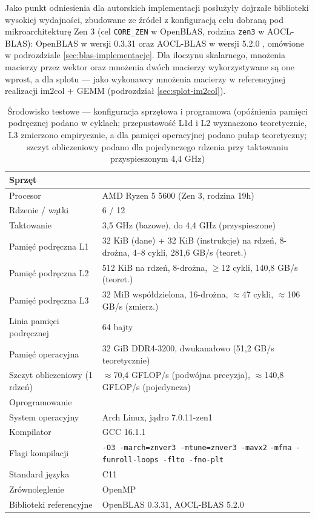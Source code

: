 \documentclass[a4paper,12pt]{book} %
\begin{document}
Jako punkt odniesienia dla autorskich implementacji posłużyły dojrzałe biblioteki wysokiej wydajności, zbudowane ze źródeł z konfiguracją celu dobraną pod mikroarchitekturę Zen 3 (cel \texttt{CORE\_ZEN} w OpenBLAS, rodzina \texttt{zen3} w AOCL-BLAS): OpenBLAS w wersji 0.3.31 \cite{zhang2012openblas} oraz AOCL-BLAS w wersji 5.2.0 \cite{amd_aocl_blas}, omówione w podrozdziale \ref{sec:blas-implementacje}. Dla iloczynu skalarnego, mnożenia macierzy przez wektor oraz mnożenia dwóch macierzy wykorzystywane są one wprost, a dla splotu --- jako wykonawcy mnożenia macierzy w referencyjnej realizacji im2col $+$ GEMM (podrozdział \ref{sec:splot-im2col}).

\begin{table}[t!]
\centering
\caption{Środowisko testowe --- konfiguracja sprzętowa i programowa (opóźnienia pamięci podręcznej podano w cyklach; przepustowość L1d i L2 wyznaczono teoretycznie, L3 zmierzono empirycznie, a dla pamięci operacyjnej podano pułap teoretyczny; szczyt obliczeniowy podano dla pojedynczego rdzenia przy taktowaniu przyspieszonym 4,4 GHz)}
\label{tab:srodowisko}
\begin{tabular}{l p{}}
\hline
\multicolumn{2}{l}{Sprzęt} \\
\hline
Procesor & AMD Ryzen 5 5600 (Zen 3, rodzina 19h) \\
Rdzenie / wątki & 6 / 12 \\
Taktowanie & 3,5 GHz (bazowe), do 4,4 GHz (przyspieszone) \\
Pamięć podręczna L1 & 32 KiB (dane) + 32 KiB (instrukcje) na rdzeń, 8-drożna, 4--8 cykli, 281,6 GB/s (teoret.) \\
Pamięć podręczna L2 & 512 KiB na rdzeń, 8-drożna, $\ge$12 cykli, 140,8 GB/s (teoret.) \\
Pamięć podręczna L3 & 32 MiB współdzielona, 16-drożna, $\approx$47 cykli, $\approx$106 GB/s (zmierz.) \\
Linia pamięci podręcznej & 64 bajty \\
Pamięć operacyjna & 32 GiB DDR4-3200, dwukanałowo (51,2 GB/s teoretycznie) \\
Szczyt obliczeniowy (1 rdzeń) & $\approx$70,4 GFLOP/s (podwójna precyzja), $\approx$140,8 GFLOP/s (pojedyncza) \\
\hline
\multicolumn{2}{l}{Oprogramowanie} \\
\hline
System operacyjny & Arch Linux, jądro 7.0.11-zen1 \\
Kompilator & GCC 16.1.1 \\
Flagi kompilacji & \texttt{-O3 -march=znver3 -mtune=znver3 -mavx2} \texttt{-mfma -funroll-loops -flto -fno-plt} \\
Standard języka & C11 \\
Zrównoleglenie & OpenMP \\
Biblioteki referencyjne & OpenBLAS 0.3.31, AOCL-BLAS 5.2.0 \\
\hline
\end{tabular}
\end{table}
\end{document}
